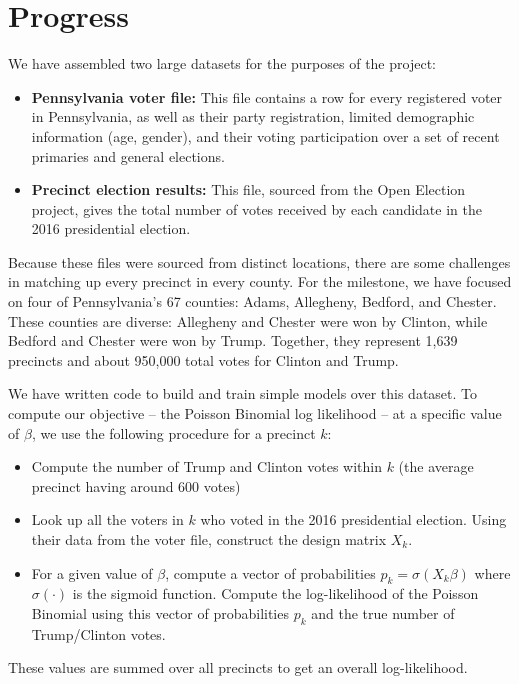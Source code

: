\documentclass{article}
\begin{document}
\section{Progress}
We have assembled two large datasets for the purposes of the project:
\begin{itemize}
\item \textbf{Pennsylvania voter file:} This file contains a row for every registered voter in Pennsylvania, as well as their party registration, limited demographic information (age, gender), and their voting participation over a set of recent primaries and general elections.  
\item \textbf{Precinct election results:} This file, sourced from the Open Election project, gives the total number of votes received by each candidate in the 2016 presidential election. 
\end{itemize}

Because these files were sourced from distinct locations, there are some challenges in matching up every precinct in every county. For the milestone, we have focused on four of Pennsylvania's 67 counties: Adams, Allegheny, Bedford, and Chester. These counties are diverse: Allegheny and Chester were won by Clinton, while Bedford and Chester were won by Trump. Together, they represent 1,639 precincts and about 950,000 total votes for Clinton and Trump. 

We have written code to build and train simple models over this dataset. To compute our objective -- the Poisson Binomial log likelihood -- at a specific value of $\beta$, we use the following procedure for a precinct $k$:
\begin{itemize}
\item Compute the number of Trump and Clinton votes within $k$ (the average precinct having around 600 votes)
\item Look up all the voters in $k$ who voted in the 2016 presidential election. Using their data from the voter file, construct the design matrix $X_k$.
\item For a given value of $\beta$, compute a vector of probabilities $p_k = \sigma(X_k \beta)$ where $\sigma(\cdot)$ is the sigmoid function. Compute the log-likelihood of the Poisson Binomial using this vector of probabilities $p_k$ and the true number of Trump/Clinton votes. 
\end{itemize}

These values are summed over all precincts to get an overall log-likelihood. 
\end{document}
